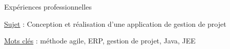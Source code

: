 \begin{rubric}{Expériences professionnelles}
     \hfill{} 
    \par \underline{Sujet} : {Conception et réalisation d'une application de gestion de projet}
    \hfill {}
    \par \underline{Mots clés} : méthode agile, ERP, gestion de projet, Java, JEE
      \hfill {}
%
%
%
\end{rubric}
